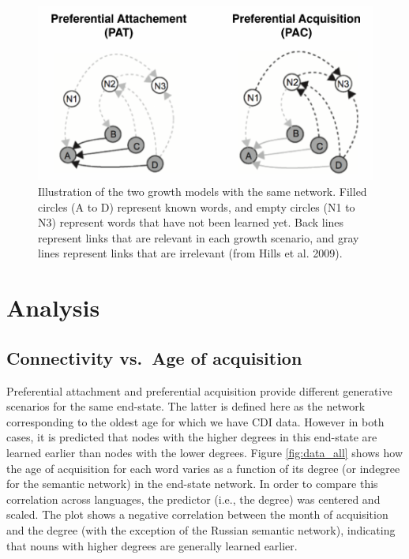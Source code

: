 \documentclass[10pt, letterpaper]{article}
\newenvironment{CodeChunk}{}{}
\begin{document}
\begin{CodeChunk}
\begin{figure}[H]

{\centering \includegraphics{figs/growth-1} 

}

\caption{\label{fig:growth}Illustration of the two growth models with the same network. Filled circles (A to D) represent known words, and empty circles (N1 to N3) represent words that have not been learned yet. Back lines represent links that are relevant in each growth scenario, and gray lines represent links that are irrelevant (from Hills et al. 2009).}\label{fig:growth}
\end{figure}
\end{CodeChunk}

\section{Analysis}\label{analysis}

\subsection{Connectivity vs.~Age of
acquisition}\label{connectivity-vs.age-of-acquisition}

Preferential attachment and preferential acquisition provide different
generative scenarios for the same end-state. The latter is defined here
as the network corresponding to the oldest age for which we have CDI
data. However in both cases, it is predicted that nodes with the higher
degrees in this end-state are learned earlier than nodes with the lower
degrees. Figure \ref{fig:data_all} shows how the age of acquisition for
each word varies as a function of its degree (or indegree for the
semantic network) in the end-state network. In order to compare this
correlation across languages, the predictor (i.e., the degree) was
centered and scaled. The plot shows a negative correlation between the
month of acquisition and the degree (with the exception of the Russian
semantic network), indicating that nouns with higher degrees are
generally learned earlier.
\end{document}
